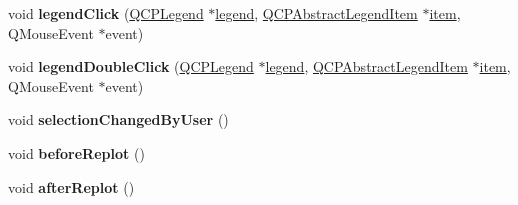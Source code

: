 \begin{DoxyCompactItemize}
\item 
\mbox{\label{class_q_custom_plot_a79cff0baafbca10a3aaf694d2d3b9ab3}} 
void {\bfseries legend\+Click} (\hyperlink{class_q_c_p_legend}{Q\+C\+P\+Legend} $\ast$\hyperlink{class_q_custom_plot_a4eadcd237dc6a09938b68b16877fa6af}{legend}, \hyperlink{class_q_c_p_abstract_legend_item}{Q\+C\+P\+Abstract\+Legend\+Item} $\ast$\hyperlink{class_q_custom_plot_ac042f2e78edd228ccf2f26b7fe215239}{item}, Q\+Mouse\+Event $\ast$event)
\item 
\mbox{\label{class_q_custom_plot_a0250f835c044521df1619b132288bca7}} 
void {\bfseries legend\+Double\+Click} (\hyperlink{class_q_c_p_legend}{Q\+C\+P\+Legend} $\ast$\hyperlink{class_q_custom_plot_a4eadcd237dc6a09938b68b16877fa6af}{legend}, \hyperlink{class_q_c_p_abstract_legend_item}{Q\+C\+P\+Abstract\+Legend\+Item} $\ast$\hyperlink{class_q_custom_plot_ac042f2e78edd228ccf2f26b7fe215239}{item}, Q\+Mouse\+Event $\ast$event)
\item 
\mbox{\label{class_q_custom_plot_a500c64a109bc773c973ad274f2fa4190}} 
void {\bfseries selection\+Changed\+By\+User} ()
\item 
\mbox{\label{class_q_custom_plot_a0cd30e29b73efd6afe096e44bc5956f5}} 
void {\bfseries before\+Replot} ()
\item 
\mbox{\label{class_q_custom_plot_a6f4fa624af060bc5919c5f266cf426a0}} 
void {\bfseries after\+Replot} ()
\end{DoxyCompactItemize}
